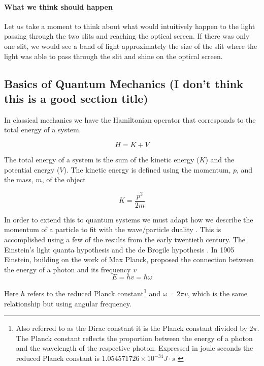 \documentclass[authoryearcitations]{UoYCSproject}
\begin{document}
\paragraph{What we think should happen}
Let us take a moment to think about what would intuitively happen to the light passing through the two slits and reaching the
optical screen. If there was only one slit, we would see a band of light approximately the size of the slit where the light was
able to pass through the slit and shine on the optical screen. 

\subsection{Basics of Quantum Mechanics (I don't think this is a good section title)}
In classical mechanics we have the Hamiltonian operator that corresponds to the total
energy of a system. 

\begin{equation}
        H = K + V
\label{eq:totalEnergy}
\end{equation}

The total energy of a system is the sum of the kinetic energy ($K$) and the potential energy ($V$).
The kinetic energy is defined using the momentum, $p$, and the mass, $m$, of the object

\begin{equation}
        K = \frac{p^2}{2m}
\label{eq:K}
\end{equation}

In order to extend this to quantum systems we must adapt how we describe the momentum of a particle to
fit with the wave/particle duality \cite{qp}. This is accomplished using a few of the results from the early 
twentieth century. The Einstein's light quanta hypothesis and the de Brogile hypothesis \cite{qp, ricardo}. In 
1905 Einstein, building on the work of Max Planck,  
proposed the connection between the energy of a photon and its frequency $v$
\begin{equation}
E = hv = \hbar\omega
\label{einsteinHyp}
\end{equation}


Here $\hbar$ refers to the reduced Planck constant\footnote{Also referred to as the Dirac constant it is
the Planck constant divided by $2\pi$. The Planck constant reflects the proportion between the energy of a photon
and the wavelength of the respective photon. Expressed in joule seconds the reduced Planck constant is 
$1.054571726 \times 10^{-34} J \cdot s $ \cite{qp} } and $\omega = 2\pi v$, which is the same relationship
but using angular frequency. 
\end{document}
